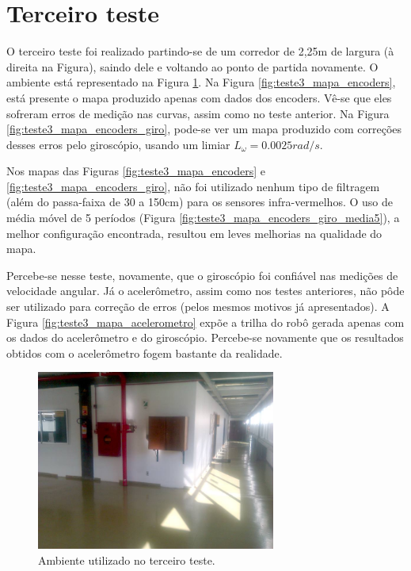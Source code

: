 \section{Terceiro teste}

O terceiro teste foi realizado partindo-se de um corredor de 2,25m de largura (à direita na Figura), saindo dele e voltando ao ponto de partida novamente. O ambiente está representado na Figura \ref{fig:teste3_foto}. Na Figura \ref{fig:teste3_mapa_encoders}, está presente o mapa produzido apenas com dados dos encoders. Vê-se que eles sofreram erros de medição nas curvas, assim como no teste anterior. Na Figura \ref{fig:teste3_mapa_encoders_giro}, pode-se ver um mapa produzido com correções desses erros pelo giroscópio, usando um limiar $L_\omega = 0.0025 \unit{rad/s}$.

Nos mapas das Figuras \ref{fig:teste3_mapa_encoders} e \ref{fig:teste3_mapa_encoders_giro}, não foi utilizado nenhum tipo de filtragem (além do passa-faixa de 30 a 150cm) para os sensores infra-vermelhos. O uso de média móvel de 5 períodos (Figura \ref{fig:teste3_mapa_encoders_giro_media5}), a melhor configuração encontrada, resultou em leves melhorias na qualidade do mapa.

Percebe-se nesse teste, novamente, que o giroscópio foi confiável nas medições de velocidade angular. Já o acelerômetro, assim como nos testes anteriores, não pôde ser utilizado para correção de erros (pelos mesmos motivos já apresentados). A Figura \ref{fig:teste3_mapa_acelerometro} expõe a trilha do robô gerada apenas com os dados do acelerômetro e do giroscópio. Percebe-se novamente que os resultados obtidos com o acelerômetro fogem bastante da realidade.

\begin{figure}[H]
	\centering
	\includegraphics[width=0.7\textwidth]{./figuras/testes/teste3/foto_ambiente.jpg}
	\caption{Ambiente utilizado no terceiro teste.}
	\label{fig:teste3_foto}
\end{figure}

